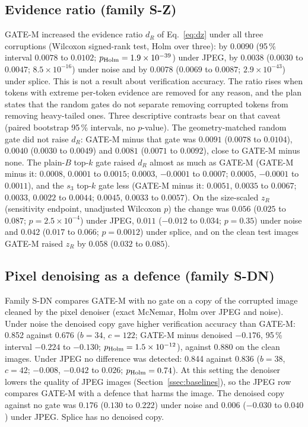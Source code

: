 \subsection{Evidence ratio (family S-Z)}\label{ssec:res_snr}
GATE-M increased the evidence ratio $d_R$ of Eq.~\eqref{eq:dz} under all three corruptions (Wilcoxon signed-rank test, Holm over
three): by $0.0090$ (95\,\% interval $0.0078$ to $0.0102$; $p_{\rm Holm}=1.9\times10^{-39}$) under JPEG, by $0.0038$ ($0.0030$ to
$0.0047$; $8.5\times10^{-16}$) under noise and by $0.0078$ ($0.0069$ to $0.0087$; $2.9\times10^{-43}$) under splice.
This is not a result about verification accuracy.
The ratio rises when tokens with extreme per-token evidence are removed for any reason, and the plan states that the random gates do not
separate removing corrupted tokens from removing heavy-tailed ones.
Three descriptive contrasts bear on that caveat (paired bootstrap 95\,\% intervals, no $p$-value).
The geometry-matched random gate did not raise $d_R$: GATE-M minus that gate was $0.0091$ ($0.0078$ to $0.0104$), $0.0040$ ($0.0030$
to $0.0049$) and $0.0081$ ($0.0071$ to $0.0092$), close to GATE-M minus none.
The plain-$B$ top-$k$ gate raised $d_R$ almost as much as GATE-M (GATE-M minus it: $0.0008$, $0.0001$ to $0.0015$; $0.0003$, $-0.0001$
to $0.0007$; $0.0005$, $-0.0001$ to $0.0011$), and the $s_3$ top-$k$ gate less (GATE-M minus it: $0.0051$, $0.0035$ to $0.0067$;
$0.0033$, $0.0022$ to $0.0044$; $0.0045$, $0.0033$ to $0.0057$).
On the size-scaled $z_R$ (sensitivity endpoint, unadjusted Wilcoxon $p$) the change was $0.056$ ($0.025$ to $0.087$; $p=2.5\times10^{-4}$)
under JPEG, $0.011$ ($-0.012$ to $0.034$; $p=0.35$) under noise and $0.042$ ($0.017$ to $0.066$; $p=0.0012$) under splice, and on the
clean test images GATE-M raised $z_R$ by $0.058$ ($0.032$ to $0.085$).

\subsection{Pixel denoising as a defence (family S-DN)}\label{ssec:res_dn}
Family S-DN compares GATE-M with no gate on a copy of the corrupted image cleaned by the pixel denoiser (exact McNemar, Holm over JPEG
and noise).
Under noise the denoised copy gave higher verification accuracy than GATE-M: 0.852 against 0.676 ($b=34$, $c=122$; GATE-M minus
denoised $-0.176$, 95\,\% interval $-0.224$ to $-0.130$; $p_{\rm Holm}=1.5\times10^{-12}$), against 0.880 on the clean images.
Under JPEG no difference was detected: 0.844 against 0.836 ($b=38$, $c=42$; $-0.008$, $-0.042$ to $0.026$; $p_{\rm Holm}=0.74$).
At this setting the denoiser lowers the quality of JPEG images (Section~\ref{ssec:baselines}), so the JPEG row compares GATE-M with a
defence that harms the image.
The denoised copy against no gate was $0.176$ ($0.130$ to $0.222$) under noise and $0.006$ ($-0.030$ to $0.040$) under JPEG.
Splice has no denoised copy.


